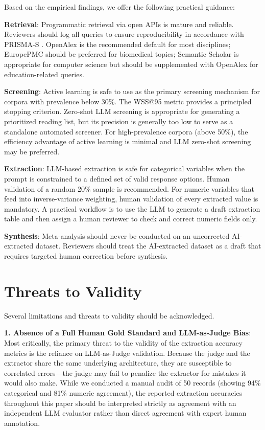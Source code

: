 \documentclass[12pt]{article}
\begin{document}
Based on the empirical findings, we offer the following practical guidance:

\textbf{Retrieval}: Programmatic retrieval via open APIs is mature and reliable. Reviewers should log all queries to ensure reproducibility in accordance with PRISMA-S \cite{rethlefsen2021prismas}. OpenAlex is the recommended default for most disciplines; EuropePMC should be preferred for biomedical topics; Semantic Scholar is appropriate for computer science but should be supplemented with OpenAlex for education-related queries.

\textbf{Screening}: Active learning is safe to use as the primary screening mechanism for corpora with prevalence below 30\%. The WSS@95 metric provides a principled stopping criterion. Zero-shot LLM screening is appropriate for generating a prioritized reading list, but its precision is generally too low to serve as a standalone automated screener. For high-prevalence corpora (above 50\%), the efficiency advantage of active learning is minimal and LLM zero-shot screening may be preferred.

\textbf{Extraction}: LLM-based extraction is safe for categorical variables when the prompt is constrained to a defined set of valid response options. Human validation of a random 20\% sample is recommended. For numeric variables that feed into inverse-variance weighting, human validation of every extracted value is mandatory. A practical workflow is to use the LLM to generate a draft extraction table and then assign a human reviewer to check and correct numeric fields only.

\textbf{Synthesis}: Meta-analysis should never be conducted on an uncorrected AI-extracted dataset. Reviewers should treat the AI-extracted dataset as a draft that requires targeted human correction before synthesis.

\section{Threats to Validity}

Several limitations and threats to validity should be acknowledged.

\textbf{1. Absence of a Full Human Gold Standard and LLM-as-Judge Bias}: Most critically, the primary threat to the validity of the extraction accuracy metrics is the reliance on LLM-as-Judge validation. Because the judge and the extractor share the same underlying architecture, they are susceptible to correlated errors---the judge may fail to penalize the extractor for mistakes it would also make. While we conducted a manual audit of 50 records (showing 94\% categorical and 81\% numeric agreement), the reported extraction accuracies throughout this paper should be interpreted strictly as agreement with an independent LLM evaluator rather than direct agreement with expert human annotation.
\end{document}

